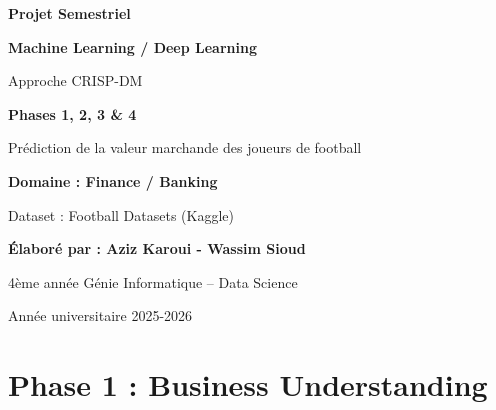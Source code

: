 \documentclass[12pt,a4paper]{article}
\begin{document}
\begin{titlepage}
    \centering
    \vspace*{2cm}
    
    {\Huge\bfseries\color{maincolor} Projet Semestriel\par}
    {\Huge\bfseries\color{maincolor}Machine Learning / Deep Learning\par}
    \vspace{0.5cm}
    {\Large Approche CRISP-DM\par}
    \vspace{1.5cm}
    
    \begin{tcolorbox}[colback=lightgray,colframe=maincolor,width=0.8\textwidth,arc=3mm,boxrule=1.5pt]
        \centering
        {\LARGE\bfseries Phases 1, 2, 3 \& 4\par}
        \vspace{0.3cm}
        {\Large Prédiction de la valeur marchande des joueurs de football\par}
    \end{tcolorbox}
    
    \vspace{2cm}
    
    {\large\bfseries Domaine : Finance / Banking\par}
    \vspace{0.5cm}
    {\large Dataset : Football Datasets (Kaggle)\par}

    \vspace{1cm}
    {\large\bfseries Élaboré par : Aziz Karoui - Wassim Sioud \par}
    
    \vfill
    
    {\large 4ème année Génie Informatique -- Data Science\par}
    \vspace{0.3cm}
    {\large Année universitaire 2025-2026\par}
    
\end{titlepage}

\tableofcontents
\newpage


\section{Phase 1 : Business Understanding}
\end{document}
